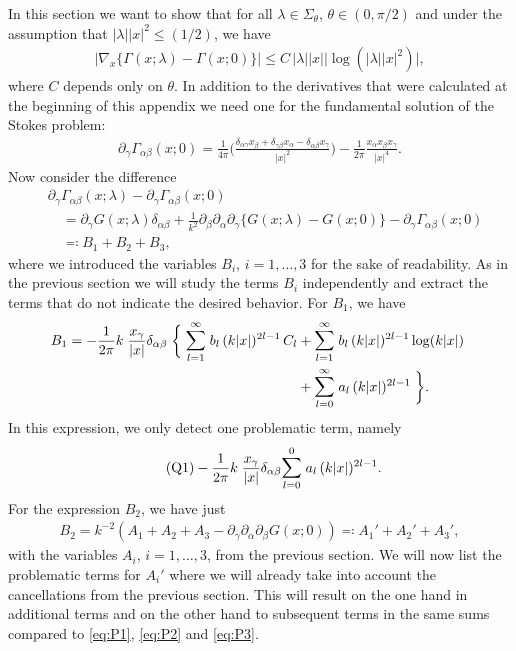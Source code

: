 In this section we want to show that for all $\lambda \in \Sigma_\theta$, $\theta \in (0,\pi/2)$ and under the assumption that $|\lambda| |x|^2 \leq (1/2)$, we have
\begin{align*}
  \big| \nabla_x \big\{ \Gamma(x; \lambda) - \Gamma(x; 0) \big\} \big| \leq C\, |\lambda| |x| \big| \log(|\lambda| |x|^2) \big|,
\end{align*}
where $C$ depends only on $\theta$.
In addition to the derivatives that were calculated at the beginning of this appendix we need one for the fundamental solution of the Stokes problem:
\begin{align*}
  \partial_\gamma \Gamma_{\alpha\beta} (x; 0) 
  = \frac{1}{4 \pi} \bigg( \frac{\delta_{\alpha\gamma} x_\beta + \delta_{\gamma\beta} x_\alpha  - \delta_{\alpha\beta} x_\gamma}{|x|^2}  \bigg) 
  - \frac{1}{2\pi} \frac{x_\alpha x_\beta x_\gamma}{|x|^4} .
\end{align*}
Now consider the difference
\begin{align*}
  &\partial_\gamma \Gamma_{\alpha\beta}(x; \lambda) - \partial_\gamma \Gamma_{\alpha\beta}(x; 0) \\
  &\quad=\partial_\gamma G(x; \lambda) \delta_{\alpha\beta}
  + \frac{1}{k^2} \partial_\beta \partial_\alpha \partial_\gamma \big\{ G(x; \lambda) - G(x; 0) \big\} 
  - \partial_\gamma \Gamma_{\alpha\beta}(x; 0) \\
  &\quad\eqqcolon B_1 + B_2 + B_3 ,
\end{align*}
where we introduced the variables $B_i$, $i = 1,\dots,3$ for the sake of readability.
As in the previous section we will study the terms $B_i$ independently and extract the terms that do not indicate the desired behavior.
For $B_1$, we have
\begin{align*}
  B_1 = -\frac{1}{2\pi} k\;  \frac{x_\gamma}{|x|} \delta_{\alpha\beta} \;
  \bigg\{ \;
  \mathlarger{\sum}_{l = 1}^\infty \; b_l \, (k|x|)^{2l - 1} \, C_l 
  &+ \mathlarger{\sum}_{l = 1}^\infty \; b_l \, (k|x|)^{2l - 1} \log(k|x|) \; \\
  &+  \mathlarger{\sum}_{l = 0}^\infty \; a_l \, (k|x|)^{2l - 1} \; \bigg\}.
\end{align*}
In this expression, we only detect one problematic term, namely
\begin{align}
  \label{eq:Q1}
  \tag{Q1}
  -\frac{1}{2\pi} k\;  \frac{x_\gamma}{|x|}\delta_{\alpha\beta} \mathlarger{\sum}_{l = 0}^0 \; a_l \, (k|x|)^{2l - 1} .
\end{align}
For the expression $B_2$, we have just 
\begin{align*}
  B_2 = k^{-2} ( A_1 + A_2 + A_3 - \partial_\gamma\partial_\alpha\partial_\beta G(x; 0) ) \eqqcolon A_1' + A_2' + A_3',
\end{align*}
with the variables $A_i$, $i = 1, \dots, 3$, from the previous section. 
We will now list the problematic terms for $A_i'$ where we will already take into account the cancellations from the previous section.
This will result on the one hand in additional terms and on the other hand to subsequent terms in the same sums compared to \eqref{eq:P1}, \eqref{eq:P2} and \eqref{eq:P3}.


